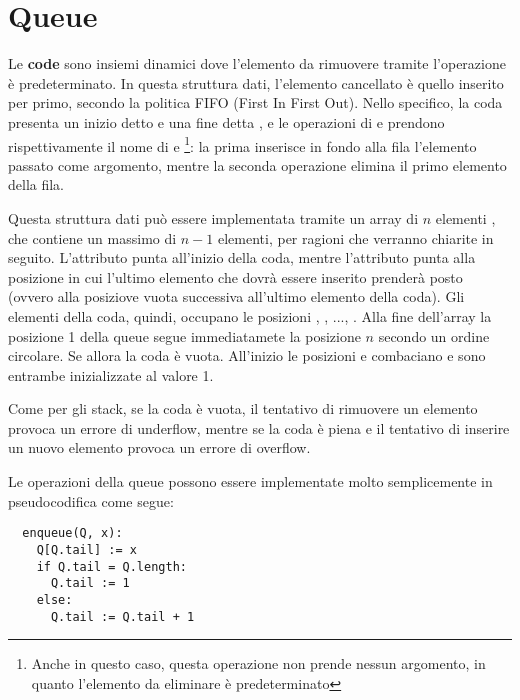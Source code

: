 \section{Queue}
Le \textbf{code} sono insiemi dinamici dove l'elemento da rimuovere tramite l'operazione  è predeterminato. In questa struttura dati, l'elemento cancellato è quello inserito per primo, secondo la politica FIFO (First In First Out). Nello specifico, la coda presenta un inizio detto  e una fine detta , e le operazioni di  e  prendono rispettivamente il nome di  e  \footnote{Anche in questo caso, questa operazione non prende nessun argomento, in quanto l'elemento da eliminare è predeterminato}: la prima inserisce in fondo alla fila l'elemento passato come argomento, mentre la seconda operazione elimina il primo elemento della fila. 

Questa struttura dati può essere implementata tramite un array di \(n\) elementi , che contiene un massimo di \(n-1\) elementi, per ragioni che verranno chiarite in seguito. L'attributo  punta all'inizio della coda, mentre l'attributo  punta alla posizione in cui l'ultimo elemento che dovrà essere inserito prenderà posto (ovvero alla posiziove vuota successiva all'ultimo elemento della coda). Gli elementi della coda, quindi, occupano le posizioni , , ..., . Alla fine dell'array la posizione 1 della queue segue immediatamete la posizione \(n\) secondo un ordine circolare. Se  allora la coda è vuota. All'inizio le posizioni  e  combaciano e sono entrambe inizializzate al valore 1.

Come per gli stack, se la coda è vuota, il tentativo di rimuovere un elemento provoca un errore di underflow, mentre se  la coda è piena e il tentativo di inserire un nuovo elemento provoca un errore di overflow. 

\vspace{1in}

Le operazioni della queue possono essere implementate molto semplicemente in pseudocodifica come segue:

\begin{lstlisting}
  enqueue(Q, x):
    Q[Q.tail] := x
    if Q.tail = Q.length:
      Q.tail := 1
    else:
      Q.tail := Q.tail + 1
\end{lstlisting}

